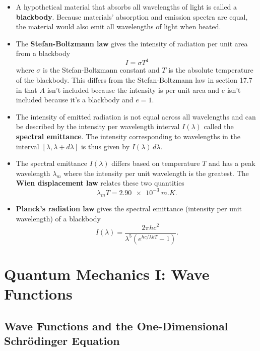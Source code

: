 \documentclass{article}
\begin{document}
\begin{itemize}
  \item A hypothetical material that absorbs all wavelengths of light is called a \textbf{blackbody}. Because materials' absorption and emission spectra are equal, the material would also emit all wavelengths of light when heated.

  \item The \textbf{Stefan-Boltzmann law} gives the intensity of radiation per unit area from a blackbody \[I = \sigma T^4\] where $\sigma$ is the Stefan-Boltzmann constant and $T$ is the absolute temperature of the blackbody. This differs from the Stefan-Boltzmann law in section 17.7 in that $A$ isn't included because the intensity is per unit area and $e$ isn't included because it's a blackbody and $e = 1$.

  \item The intensity of emitted radiation is not equal across all wavelengths and can be described by the intensity per wavelength interval $I(\lambda)$ called the \textbf{spectral emittance}. The intensity corresponding to wavelengths in the interval $[\lambda, \lambda + d \lambda]$ is thus given by $I(\lambda) \,d\lambda$.

\item The spectral emittance $I(\lambda)$ differs based on temperature $T$ and has a peak wavelength $\lambda_m$ where the intensity per unit wavelength is the greatest. The \textbf{Wien displacement law} relates these two quantities \[\lambda_m T = \qty{2.90e-3}{m.K}.\]

  \item \textbf{Planck's radiation law} gives the spectral emittance (intensity per unit wavelength) of a blackbody \[I(\lambda) = \frac{2 \pi h c^2}{\lambda^5 (e^{h c / \lambda k T} - 1)}.\]
\end{itemize}

\section{Quantum Mechanics I: Wave Functions}

\subsection{Wave Functions and the One-Dimensional\\Schrödinger Equation}
\end{document}
